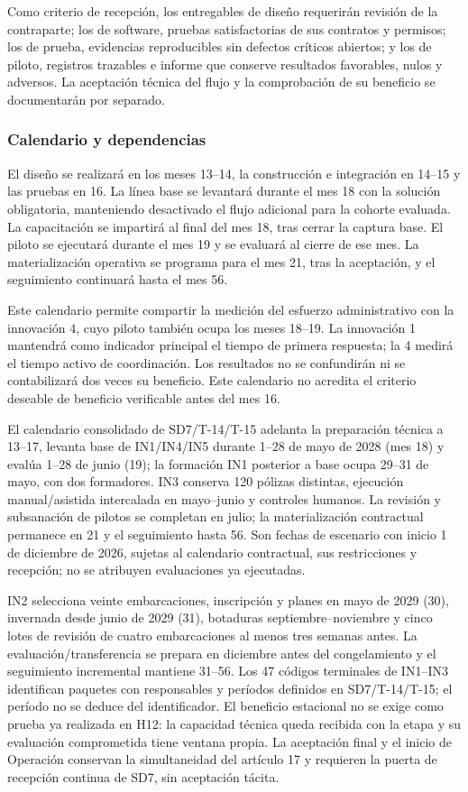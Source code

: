 Como criterio de recepción, los entregables de diseño requerirán revisión de la contraparte; los de software, pruebas satisfactorias de sus contratos y permisos; los de prueba, evidencias reproducibles sin defectos críticos abiertos; y los de piloto, registros trazables e informe que conserve resultados favorables, nulos y adversos. La aceptación técnica del flujo y la comprobación de su beneficio se documentarán por separado.

\subsubsection{Calendario y dependencias}
El diseño se realizará en los meses 13--14, la construcción e integración en 14--15 y las pruebas en 16. La línea base se levantará durante el mes 18 con la solución obligatoria, manteniendo desactivado el flujo adicional para la cohorte evaluada. La capacitación se impartirá al final del mes 18, tras cerrar la captura base. El piloto se ejecutará durante el mes 19 y se evaluará al cierre de ese mes. La materialización operativa se programa para el mes 21, tras la aceptación, y el seguimiento continuará hasta el mes 56.

Este calendario permite compartir la medición del esfuerzo administrativo con la innovación 4, cuyo piloto también ocupa los meses 18--19. La innovación 1 mantendrá como indicador principal el tiempo de primera respuesta; la 4 medirá el tiempo activo de coordinación. Los resultados no se confundirán ni se contabilizará dos veces su beneficio. Este calendario no acredita el criterio deseable de beneficio verificable antes del mes 16.

El calendario consolidado de SD7/T-14/T-15 adelanta la preparación técnica a 13--17, levanta base de IN1/IN4/IN5 durante 1--28 de mayo de 2028 (mes 18) y evalúa 1--28 de junio (19); la formación IN1 posterior a base ocupa 29--31 de mayo, con dos formadores. IN3 conserva 120 pólizas distintas, ejecución manual/asistida intercalada en mayo--junio y controles humanos. La revisión y subsanación de pilotos se completan en julio; la materialización contractual permanece en 21 y el seguimiento hasta 56. Son fechas de escenario con inicio 1 de diciembre de 2026, sujetas al calendario contractual, sus restricciones y recepción; no se atribuyen evaluaciones ya ejecutadas.

IN2 selecciona veinte embarcaciones, inscripción y planes en mayo de 2029 (30), invernada desde junio de 2029 (31), botaduras septiembre--noviembre y cinco lotes de revisión de cuatro embarcaciones al menos tres semanas antes. La evaluación/transferencia se prepara en diciembre antes del congelamiento y el seguimiento incremental mantiene 31--56. Los 47 códigos terminales de IN1--IN3 identifican paquetes con responsables y períodos definidos en SD7/T-14/T-15; el período no se deduce del identificador. El beneficio estacional no se exige como prueba ya realizada en H12: la capacidad técnica queda recibida con la etapa y su evaluación comprometida tiene ventana propia. La aceptación final y el inicio de Operación conservan la simultaneidad del artículo 17 y requieren la puerta de recepción continua de SD7, sin aceptación tácita.

